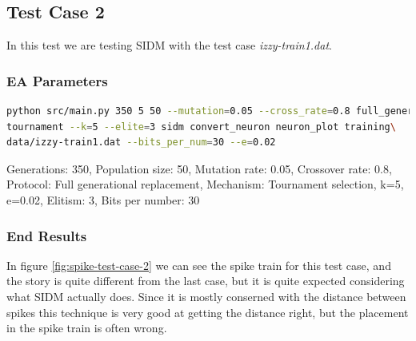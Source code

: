 \subsection{Test Case 2}\label{sec:test-case-2}
In this test we are testing SIDM with the test case
\textit{izzy-train1.dat}.
\subsubsection{EA Parameters}\label{sec:test-case-2-parameters}
\begin{lstlisting}[frame=single, language=bash, caption=Command-line to
replicate the results]
python src/main.py 350 5 50 --mutation=0.05 --cross_rate=0.8 full_generational
tournament --k=5 --elite=3 sidm convert_neuron neuron_plot training\
data/izzy-train1.dat --bits_per_num=30 --e=0.02
\end{lstlisting}
Generations: 350, Population size: 50, Mutation rate: 0.05, Crossover rate: 0.8, Protocol: Full generational replacement, Mechanism: Tournament selection, k=5, e=0.02, Elitism: 3, Bits per number: 30
\subsubsection{End Results}\label{sec:test-case-2-results}
In figure \ref{fig:spike-test-case-2} we can see the spike train for this test
case, and the story is quite different from the last case, but it is quite
expected considering what SIDM actually does. Since it is mostly conserned with
the distance between spikes this technique is very good at getting the distance
right, but the placement in the spike train is often wrong.

